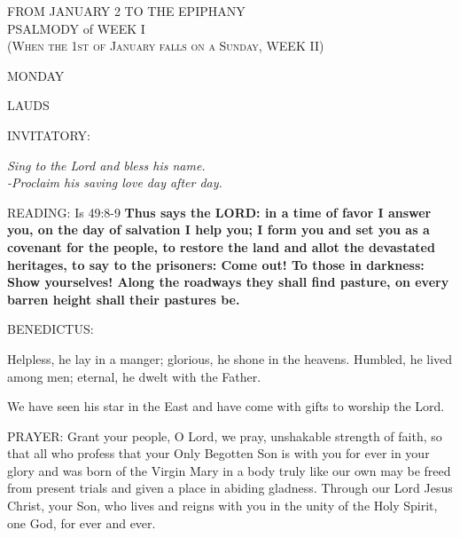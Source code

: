 \pagebreak
\begin{center}\normalsize FROM JANUARY 2 TO THE EPIPHANY\\
\noindent\footnotesize{\uppercase{PSALMODY} of WEEK I\\}
\tiny\textsc{(When the 1st of January falls on a Sunday, WEEK II)}
\end{center}

\begin{center}\normalsize MONDAY\\
\end{center}


\begin{flushleft}\normalsize{\uppercase{LAUDS\\}}\end{flushleft}
\small{\uppercase{INVITATORY:}}\normalsize
\begin{center}
\textit{Sing to the Lord and bless his name.\\}
\textit{-Proclaim his saving love day after day.\\}
\end{center}
\noindent\small{\uppercase{READING:}}    Is 49:8-9 \textbf{   Thus says the LORD: in a time of favor I answer you, on the day of salvation I help you; I form you and set you as a covenant for the people, to restore the land and allot the devastated heritages, to say to the prisoners: Come out! To those in darkness: Show yourselves! Along the roadways they shall find pasture, on every barren height shall their pastures be.\\}

\noindent\small{\uppercase{BENEDICTUS:}}\begin{description}[labelindent=\parindent, leftmargin=*]
\item [(before Epiphany)] Helpless, he lay in a manger; glorious, he shone in the heavens. Humbled, he lived among men; eternal, he dwelt with the Father.
\item [(Wednesday after the Epiphany)]We have seen his star in the East and have come with gifts to worship the Lord.
\end{description}

\noindent\small{\uppercase{PRAYER:}}	Grant your people, O Lord, we pray, unshakable strength of faith, so that all who profess that your Only Begotten Son is with you for ever in your glory and was born of the Virgin Mary in a body truly like our own may be freed from present trials and given a place in abiding gladness. Through our Lord Jesus Christ, your Son, who lives and reigns with you in the unity of the Holy Spirit, one God, for ever and ever.

